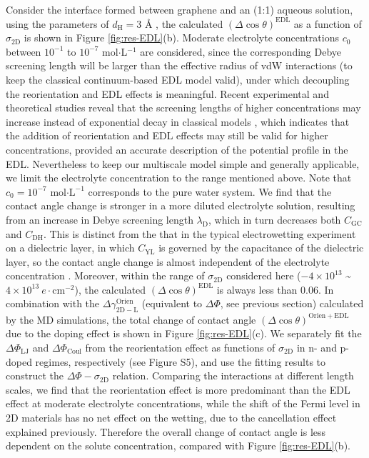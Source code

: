 \documentclass[journal=langd5,manuscript=article,email=true,hyperref=true,keywords=true]{achemso}
\begin{document}
Consider the interface formed between graphene and an (1:1) aqueous
solution, using the parameters of \(d_{\mathrm{H}}=3\) Å
\cite{mcclendon_thickness_1927},
the calculated \((\Delta \cos \theta)^{\mathrm{EDL}}\) as a function
of \(\sigma_{\mathrm{2D}}\) is shown in Figure \ref{fig:res-EDL}(b).
Moderate electrolyte concentrations \(c_{0}\) between \(10^{-1}\) to
\(10^{-7}\) mol\(\cdot\)L\(^{-1}\) are considered, since the corresponding Debye
screening length will be larger than the effective radius of vdW
interactions (to keep the classical continuum-based EDL model valid), under which decoupling the reorientation and EDL effects is
meaningful. Recent experimental and theoretical studies reveal that
the screening lengths of higher concentrations may increase instead of
exponential decay in classical models
\cite{Smith_2016_screening_length,Lee_2017_screening_length}, which
indicates that the addition of reorientation and EDL effects may still be
valid for higher concentrations, provided an accurate description of
the potential profile in the EDL. Nevertheless to keep our multiscale
model simple and generally applicable, we limit the electrolyte
concentration to the range mentioned above. Note that
\(c_{0}=10^{-7}\) mol\(\cdot \mathrm{L}^{-1}\) corresponds to the pure
water system. We find that the contact angle change is stronger in a
more diluted electrolyte solution, resulting from an increase in Debye
screening length \(\lambda_{\mathrm{D}}\), which in turn decreases
both \(C_{\mathrm{GC}}\) and \(C_{\mathrm{DH}}\). This is distinct
from the that in the typical electrowetting experiment on a dielectric
layer, in which \(C_{\mathrm{YL}}\) is governed by the capacitance of
the dielectric layer, so the contact angle change is almost
independent of the electrolyte concentration
\cite{Mugele_2005}. Moreover, within the range of
\(\sigma_{\mathrm{2D}}\) considered here (\(-4\times10^{13}\)
\textasciitilde{} \(4\times10^{13}\ e\cdot \mathrm{cm}^{-2}\)), the
calculated \((\Delta \cos \theta)^{\mathrm{EDL}}\) is always less than
0.06.  In combination with the
\(\Delta \gamma^{\mathrm{Orien}}_{\mathrm{2D-L}}\) (equivalent to
\(\Delta \Phi\), see previous section) calculated by the MD
simulations, the total change of contact angle
\((\Delta \cos \theta)^{\mathrm{Orien + EDL}}\) due to the doping
effect is shown in Figure \ref{fig:res-EDL}(c). We separately fit the
\(\Delta \Phi_{\mathrm{LJ}}\) and \(\Delta \Phi_{\mathrm{Coul}}\) from
the reorientation effect as functions of \(\sigma_{\mathrm{2D}}\) in
n- and p-doped regimes, respectively (see Figure S5), and use the
fitting results to construct the \(\Delta \Phi-\sigma_{\mathrm{2D}}\)
relation. Comparing the interactions at different length scales, we
find that the reorientation effect is more predominant than the EDL
effect at moderate electrolyte concentrations, while the shift of the
Fermi level in 2D materials has no net effect on the wetting, due to the
cancellation effect explained previously. Therefore the overall change
of contact angle is less dependent on the solute concentration,
compared with Figure \ref{fig:res-EDL}(b).
\end{document}
